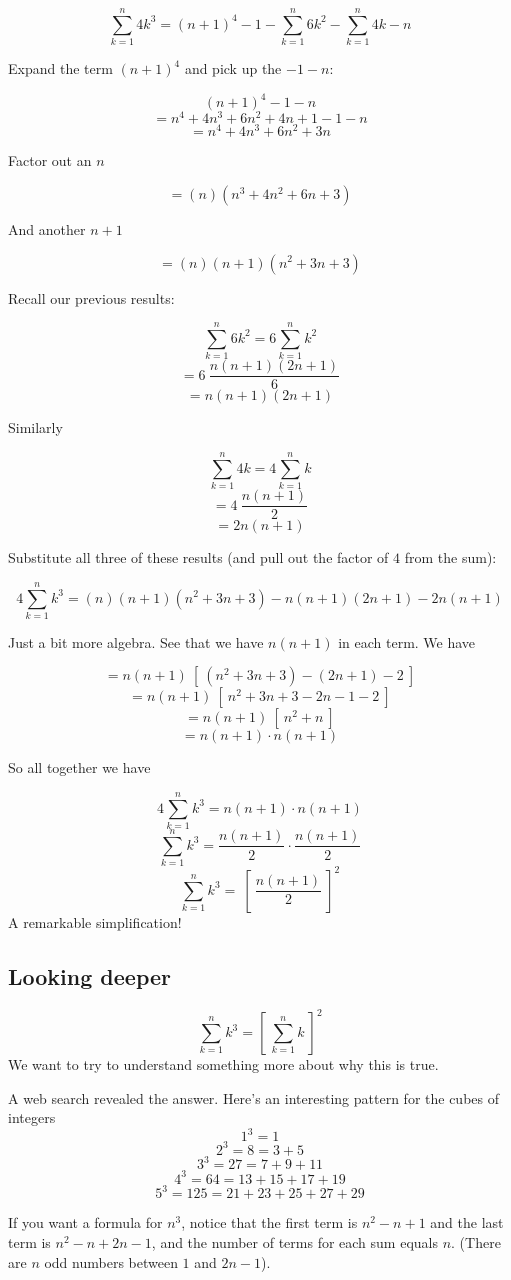 \documentclass[11pt, oneside]{article}
\begin{document}
\[ \sum_{k=1}^n 4k^3 = (n+1)^4 - 1 - \sum_{k=1}^n 6k^2 - \sum_{k=1}^n 4k - n \]

Expand the term $(n+1)^4$ and pick up the $-1 - n$:

\[ (n+1)^4 - 1 - n \]
\[ = n^4 + 4n^3 + 6n^2 + 4n + 1 - 1 - n \]
\[ =  n^4 + 4n^3 + 6n^2 + 3n  \]

Factor out an $n$

\[ = (n)(n^3 + 4n^2 + 6n + 3) \]

And another $n+1$

\[ = (n)(n+1)(n^2 + 3n + 3) \]

Recall our previous results:

\[ \sum_{k=1}^n 6k^2 = 6 \sum_{k=1}^n k^2 \]
\[ = 6 \ \frac{n(n+1)(2n+1)}{6}  \] 
\[ = n(n+1)(2n+1) \] 

Similarly

\[ \sum_{k=1}^n 4k = 4 \sum_{k=1}^n k \]
\[ = 4 \ \frac{n(n+1)}{2} \]
\[ = 2 n(n+1) \]

Substitute all three of these results (and pull out the factor of $4$ from the sum):

\[ 4\sum_{k=1}^n k^3 = (n)(n+1)(n^2 + 3n + 3) - n(n+1)(2n+1) -  2 n(n+1) \] 

Just a bit more algebra.  See that we have $n(n+1)$ in each term.  We have

\[ = n(n+1) \ [ \ (n^2 + 3n + 3) - (2n+1) -  2 \ ]  \]
\[ = n(n+1) \ [ \ n^2 + 3n + 3 - 2n - 1 -  2 \ ]  \]
\[ = n(n+1) \ [ \ n^2 + n  \ ]  \]
\[ = n(n+1)  \cdot  n(n+1)  \]

So all together we have

\[ 4\sum_{k=1}^n k^3 = n(n+1) \cdot n (n+1) \] 
\[ \sum_{k=1}^n k^3 = \frac{n(n+1)}{2} \cdot \frac{n (n+1)}{2} \] 
\[ \sum_{k=1}^n k^3 = \ [ \ \frac{n(n+1)}{2} \ ]^2 \] 
A remarkable simplification! 

\subsection*{Looking deeper}

\[ \sum\limits_{k=1}^n k^3 = [\ \sum\limits_{k=1}^n k \ ] ^2 \]
We want to try to understand something more about why this is true.  

A web search revealed the answer.  Here's an interesting pattern for the cubes of integers
\[ 1^3 = 1 \]
\[ 2^3 = 8 = 3 + 5 \]
\[ 3^3 = 27 = 7 + 9 + 11 \]
\[ 4^3 = 64 = 13 + 15 + 17 + 19 \]
\[ 5^3 = 125 = 21 + 23 + 25 + 27 + 29  \]

If you want a formula for $n^3$, notice that the first term is $n^2 - n + 1$ and the last term is $n^2 - n + 2n - 1$, and the number of terms for each sum equals $n$.  (There are $n$ odd numbers between $1$ and $2n-1$).
\end{document}
